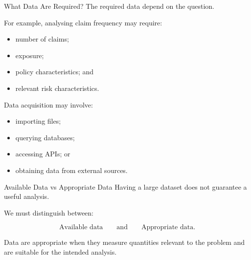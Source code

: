 \documentclass[
  ignorenonframetext,
  aspectratio=169,
]{beamer}
\providecommand{\tightlist}{%
  \setlength{\itemsep}{0pt}\setlength{\parskip}{0pt}}
\begin{document}
\begin{frame}{What Data Are Required?}
\protect{}\label{what-data-are-required}
The required data depend on the question.

For example, analysing claim frequency may require:

\begin{itemize}
\tightlist
\item
  number of claims;
\item
  exposure;
\item
  policy characteristics; and
\item
  relevant risk characteristics.
\end{itemize}

Data acquisition may involve:

\begin{itemize}
\tightlist
\item
  importing files;
\item
  querying databases;
\item
  accessing APIs; or
\item
  obtaining data from external sources.
\end{itemize}
\end{frame}

\begin{frame}{Available Data vs Appropriate Data}
\protect{}\label{available-data-vs-appropriate-data}
Having a large dataset does not guarantee a useful analysis.

We must distinguish between:

\[
\boxed{\text{Available data}}
\qquad\text{and}\qquad
\boxed{\text{Appropriate data}}.
\]

Data are appropriate when they measure quantities relevant to the
problem and are suitable for the intended analysis.
\end{frame}
\end{document}
